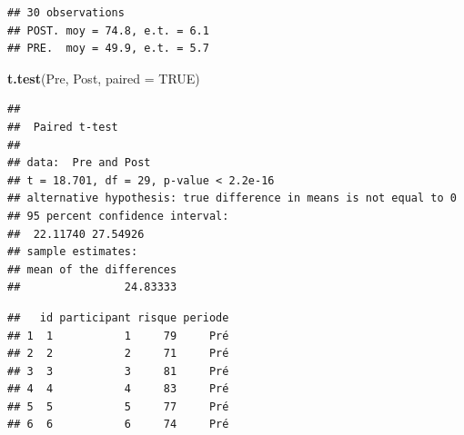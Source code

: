 \documentclass[
  11pt,
  french,
]{book}
\makeatletter
\newenvironment{Shaded}{\begin{snugshade}}{\end{snugshade}}
\newcommand{\CommentTok}[1]{\textcolor[rgb]{0.56,0.35,0.01}{\textit{#1}}}
\newcommand{\DataTypeTok}[1]{\textcolor[rgb]{0.13,0.29,0.53}{#1}}
\newcommand{\DecValTok}[1]{\textcolor[rgb]{0.00,0.00,0.81}{#1}}
\newcommand{\KeywordTok}[1]{\textcolor[rgb]{0.13,0.29,0.53}{\textbf{#1}}}
\newcommand{\NormalTok}[1]{#1}
\newcommand{\OperatorTok}[1]{\textcolor[rgb]{0.81,0.36,0.00}{\textbf{#1}}}
\newcommand{\OtherTok}[1]{\textcolor[rgb]{0.56,0.35,0.01}{#1}}
\newcommand{\StringTok}[1]{\textcolor[rgb]{0.31,0.60,0.02}{#1}}
\newenvironment{kframe}{%
\medskip{}
\setlength{\fboxsep}{.8em}
 \def\at@end@of@kframe{}%
 \ifinner\ifhmode%
  \def\at@end@of@kframe{\end{minipage}}%
  \begin{minipage}{\columnwidth}%
 \fi\fi%
 \def\FrameCommand##1{\hskip\@totalleftmargin \hskip-\fboxsep
 \colorbox{shadecolor}{##1}\hskip-\fboxsep
     \hskip-\linewidth \hskip-\@totalleftmargin \hskip\columnwidth}%
 \MakeFramed {\advance\hsize-\width
   \@totalleftmargin\z@ \linewidth\hsize
   \@setminipage}}%
 {\par\unskip\endMakeFramed%
 \at@end@of@kframe}
\renewenvironment{Shaded}{\begin{kframe}}{\end{kframe}}
\makeatother
\begin{document}
\begin{verbatim}
## 30 observations
## POST. moy = 74.8, e.t. = 6.1
## PRE.  moy = 49.9, e.t. = 5.7
\end{verbatim}

\begin{Shaded}
\begin{Highlighting}[]
\KeywordTok{t.test}\NormalTok{(Pre, Post, }\DataTypeTok{paired =} \OtherTok{TRUE}\NormalTok{)}
\end{Highlighting}
\end{Shaded}

\begin{verbatim}
## 
## 	Paired t-test
## 
## data:  Pre and Post
## t = 18.701, df = 29, p-value < 2.2e-16
## alternative hypothesis: true difference in means is not equal to 0
## 95 percent confidence interval:
##  22.11740 27.54926
## sample estimates:
## mean of the differences 
##                24.83333
\end{verbatim}

\begin{Shaded}
\end{Shaded}

\begin{verbatim}
##   id participant risque periode
## 1  1           1     79     Pré
## 2  2           2     71     Pré
## 3  3           3     81     Pré
## 4  4           4     83     Pré
## 5  5           5     77     Pré
## 6  6           6     74     Pré
\end{verbatim}

\begin{Shaded}
\end{Shaded}
\end{document}
